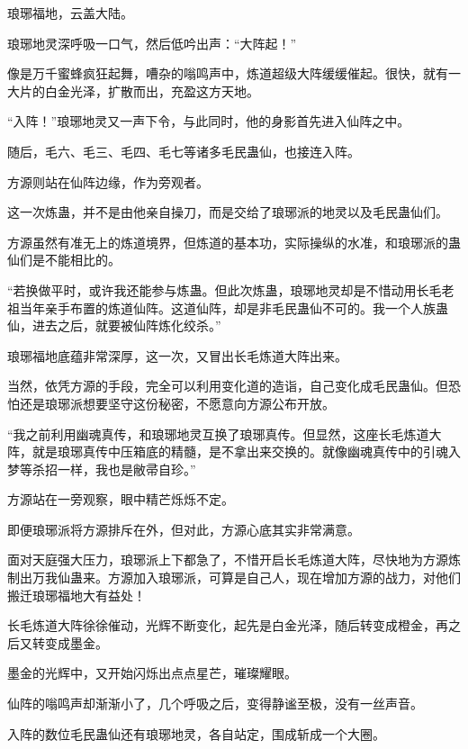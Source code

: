 
\begin{this_body}



琅琊福地，云盖大陆。

琅琊地灵深呼吸一口气，然后低吟出声：“大阵起！”

像是万千蜜蜂疯狂起舞，嘈杂的嗡鸣声中，炼道超级大阵缓缓催起。很快，就有一大片的白金光泽，扩散而出，充盈这方天地。

“入阵！”琅琊地灵又一声下令，与此同时，他的身影首先进入仙阵之中。

随后，毛六、毛三、毛四、毛七等诸多毛民蛊仙，也接连入阵。

方源则站在仙阵边缘，作为旁观者。

这一次炼蛊，并不是由他亲自操刀，而是交给了琅琊派的地灵以及毛民蛊仙们。

方源虽然有准无上的炼道境界，但炼道的基本功，实际操纵的水准，和琅琊派的蛊仙们是不能相比的。

“若换做平时，或许我还能参与炼蛊。但此次炼蛊，琅琊地灵却是不惜动用长毛老祖当年亲手布置的炼道仙阵。这道仙阵，却是非毛民蛊仙不可的。我一个人族蛊仙，进去之后，就要被仙阵炼化绞杀。”

琅琊福地底蕴非常深厚，这一次，又冒出长毛炼道大阵出来。

当然，依凭方源的手段，完全可以利用变化道的造诣，自己变化成毛民蛊仙。但恐怕还是琅琊派想要坚守这份秘密，不愿意向方源公布开放。

“我之前利用幽魂真传，和琅琊地灵互换了琅琊真传。但显然，这座长毛炼道大阵，就是琅琊真传中压箱底的精髓，是不拿出来交换的。就像幽魂真传中的引魂入梦等杀招一样，我也是敝帚自珍。”

方源站在一旁观察，眼中精芒烁烁不定。

即便琅琊派将方源排斥在外，但对此，方源心底其实非常满意。

面对天庭强大压力，琅琊派上下都急了，不惜开启长毛炼道大阵，尽快地为方源炼制出万我仙蛊来。方源加入琅琊派，可算是自己人，现在增加方源的战力，对他们搬迁琅琊福地大有益处！

长毛炼道大阵徐徐催动，光辉不断变化，起先是白金光泽，随后转变成橙金，再之后又转变成墨金。

墨金的光辉中，又开始闪烁出点点星芒，璀璨耀眼。

仙阵的嗡鸣声却渐渐小了，几个呼吸之后，变得静谧至极，没有一丝声音。

入阵的数位毛民蛊仙还有琅琊地灵，各自站定，围成斩成一个大圈。


\end{this_body}
